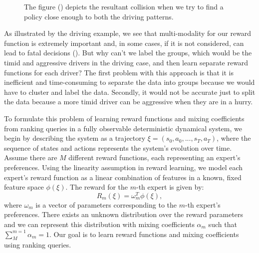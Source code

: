 \documentclass[
  letterpaper,
  numbers=noenddot,
  DIV=11,
  oneside]{scrreprt}
\theoremstyle{remark}
\begin{document}
\begin{figure}


\caption{\label{fig-driving-coll}The figure
() depicts the
resultant collision when we try to find a policy close enough to both
the driving patterns.}

\end{figure}%

As illustrated by the driving example, we see that multi-modality for
our reward function is extremely important and, in some cases, if it is
not considered, can lead to fatal decisions
(). But why can't we
label the groups, which would be the timid and aggressive drivers in the
driving case, and then learn separate reward functions for each driver?
The first problem with this approach is that it is inefficient and
time-consuming to separate the data into groups because we would have to
cluster and label the data. Secondly, it would not be accurate just to
split the data because a more timid driver can be aggressive when they
are in a hurry.

To formulate this problem of learning reward functions and mixing
coefficients from ranking queries in a fully observable deterministic
dynamical system, we begin by describing the system as a trajectory
\(\xi = (s_0, a_0, ..., s_T, a_T)\), where the sequence of states and
actions represents the system's evolution over time. Assume there are
\(M\) different reward functions, each representing an expert's
preferences. Using the linearity assumption in reward learning, we model
each expert's reward function as a linear combination of features in a
known, fixed feature space \(\phi(\xi)\). The reward for the \(m\)-th
expert is given by: \[R_m(\xi) = \omega^T_m \phi(\xi),\] where
\(\omega_m\) is a vector of parameters corresponding to the \(m\)-th
expert's preferences. There exists an unknown distribution over the
reward parameters and we can represent this distribution with mixing
coefficients \(\alpha_m\) such that \(\sum_M^{m = 1} \alpha_m = 1\). Our
goal is to learn reward functions and mixing coefficients using ranking
queries.
\end{document}
